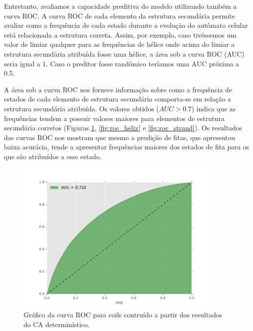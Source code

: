 Entretanto, avaliamos a capacidade preditiva do modelo utilizando também a curva ROC. A curva ROC de cada elemento da estrutura secundária permite avaliar como a frequência de cada estado durante a evolução do autômato celular está relacionada a estrutura correta. Assim, por exemplo, caso tivéssemos um valor de limiar qualquer para as frequências de hélice onde acima do limiar a estrutura secundária atribuída fosse uma hélice, a área sob a curva ROC (AUC) seria igual a 1. Caso o preditor fosse randômico teríamos uma AUC próxima a 0.5. 

A área sob a curva ROC nos fornece informação sobre como a frequência de estados de cada elemento de estrutura secundária comporta-se em relação a estrutura secundária atribuída. Os valores obtidos ($AUC > 0.7$) indica que as frequências tendem a possuir valores maiores para elementos de estrutura secundária corretos (Figuras \ref{fig:roc_coil}, \ref{fig:roc_helix} e \ref{fig:roc_strand}). Os resultados das curvas ROC nos mostram que mesmo a predição de fitas, que apresentou baixa acurácia, tende a apresentar frequências maiores dos estados de fita para os que são atribuídos a esse estado.   

\begin{figure}
	\centering
	\includegraphics[width=0.9\textwidth]{figures/figure_roc_coil.pdf}
	\caption{Gráfico da curva ROC para coils contruído a partir dos resultados do CA determinístico.}
	\label{fig:roc_coil}
\end{figure}

